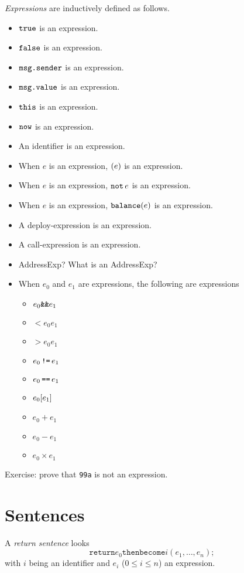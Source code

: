 \documentclass{book}
\begin{document}
\textit{Expressions} are inductively defined as follows.

\begin{itemize}
\item $\text{\texttt{true}}$ is an expression.
\item $\text{\texttt{false}}$ is an expression.
\item $\text{\texttt{msg.sender}}$ is an expression.
\item $\text{\texttt{msg.value}}$ is an expression.
\item $\text{\texttt{this}}$ is an expression.
\item $\text{\texttt{now}}$ is an expression.
\item An identifier is an expression.
\item When $e$ is an expression, $\mathtt{(}{e}\mathtt{)}$ is an expression.
\item When $e$ is an expression, $\mathop{\text{\texttt{not}}}{e}$ is an expression.
\item When $e$ is an expression, $\text{\texttt{balance}}\mathtt{(}{e}\mathtt{)}$ is an expression.
\item A deploy-expression is an expression.
\item A call-expression is an expression.
\item AddressExp?  What is an AddressExp?
\item When $e_0$ and $e_1$ are expressions, the following are expressions
\begin{itemize}
\item ${e_0}\mathbin{\text{\texttt{\&\&}}{e_1}}$
\item $\lt{e_0}{e_1}$
\item $\gt{e_0}{e_1}$
\item ${e_0} \mathop{\text{\texttt{!=}}} {e_1}$
\item ${e_0} \mathop{\text{\texttt{==}}} {e_1}$
\item ${e_0}[{e_1}]$
\item $e_0 + e_1$
\item $e_0 - e_1$
\item $e_0 \times e_1$
\end{itemize}
\end{itemize}

Exercise: prove that \texttt{99a} is not an expression.

\section{Sentences}

A \textit{return sentence} looks
\[
\texttt{return} e_0 \texttt{then} \texttt{become} i(e_1,\ldots,e_n);
\]
with $i$ being an identifier and $e_i$ ($0 \le i \le n$) an expression.
\end{document}
